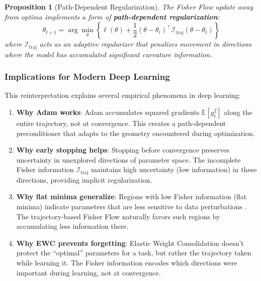 \documentclass[11pt]{article}
\newtheorem{proposition}[theorem]{Proposition}
\begin{document}
\begin{proposition}[Path-Dependent Regularization]
The Fisher Flow update away from optima implements a form of \textbf{path-dependent regularization}:
\begin{equation}
\theta_{t+1} = \arg\min_\theta \left\{ \ell(\theta) + \frac{1}{2}(\theta - \theta_t)^\top \mathcal{I}_{\text{traj}} (\theta - \theta_t) \right\}
\end{equation}
where $\mathcal{I}_{\text{traj}}$ acts as an adaptive regularizer that penalizes movement in directions where the model has accumulated significant curvature information.
\end{proposition}

\subsubsection{Implications for Modern Deep Learning}

This reinterpretation explains several empirical phenomena in deep learning:

\begin{enumerate}
\item \textbf{Why Adam works}: Adam accumulates squared gradients $\mathbb{E}[g_t^2]$ along the entire trajectory, not at convergence. This creates a path-dependent preconditioner that adapts to the geometry encountered during optimization.

\item \textbf{Why early stopping helps}: Stopping before convergence preserves uncertainty in unexplored directions of parameter space. The incomplete Fisher information $\mathcal{I}_{\text{traj}}$ maintains high uncertainty (low information) in these directions, providing implicit regularization.

\item \textbf{Why flat minima generalize}: Regions with low Fisher information (flat minima) indicate parameters that are less sensitive to data perturbations \cite{hochreiter1997flat,keskar2017large}. The trajectory-based Fisher Flow naturally favors such regions by accumulating less information there.

\item \textbf{Why EWC prevents forgetting}: Elastic Weight Consolidation doesn't protect the ``optimal'' parameters for a task, but rather the trajectory taken while learning it. The Fisher information encodes which directions were important during learning, not at convergence.
\end{enumerate}
\end{document}
